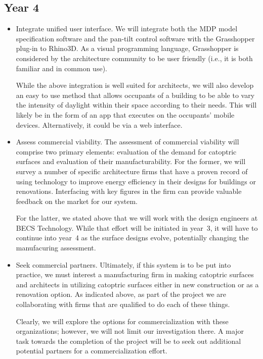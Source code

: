 \documentclass[11pt]{article}
\begin{document}
\subsection*{Year 4}

\begin{itemize}

\item Integrate unified user interface.
We will integrate both the MDP model specification software and the
pan-tilt control software with the Grasshopper plug-in to Rhino3D.
As a visual programming language, Grasshopper is considered by
the architecture community to be user friendly (i.e., it is both familiar
and in common use).

While the above integration is well suited for architects, we will also
develop an easy to use method that allows occupants of a building to
be able to vary the intensity of daylight within their space according
to their needs. This will likely be in the form of an app that executes
on the occupants' mobile devices. Alternatively, it could be via a web
interface.

\item Assess commercial viability.
The assessment of commercial viability will comprise two primary elements:
evaluation of the demand for catoptric surfaces and evaluation of their
manufacturability.  For the former, we will survey a number of specific
architecture firms that have a proven record of using technology to
improve energy efficiency in their designs for buildings or renovations.
Interfacing with key figures in the firm can provide valuable feedback on
the market for our system.

For the latter, we stated above that we will work with the design engineers
at BECS Technology.  While that effort will be initiated in year~3, it will
have to continue into year~4 as the surface designs evolve, potentially
changing the manufacuring assessment.

\item Seek commercial partners.
Ultimately, if this system is to be put into practice, we must interest
a manufacturing firm in making catoptric surfaces and architects in utilizing
catoptric surfaces either in new construction or as a renovation option.
As indicated above, as part of the project
we are collaborating with firms that are qualified to
do each of these things.

Clearly, we will explore the options for commercialization with these
organizations; however, we will not limit our investigation there.  A major
task towards the completion of the project will be to seek out additional
potential partners for a commercialization effort.

\end{itemize}
\end{document}
